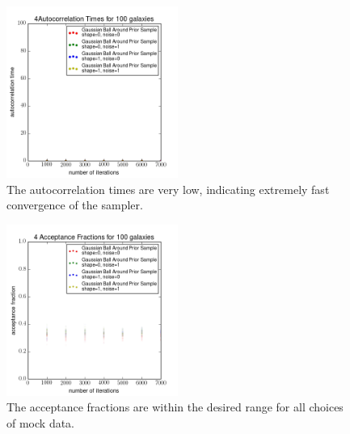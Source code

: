 \documentclass[preprint]{aastex}
\begin{document}


\begin{figure}
\includegraphics[width=0.5\textwidth]{times-toy.png}
\caption{The autocorrelation times are very low, indicating extremely fast convergence of the sampler.}
\label{fig:dumbestacor}
\end{figure}

\begin{figure}
\includegraphics[width=0.5\textwidth]{fracs-toy.png}
\caption{The acceptance fractions are within the desired range for all choices of mock data.}
\label{fig:dumbestfrac}
\end{figure}
\end{document}
